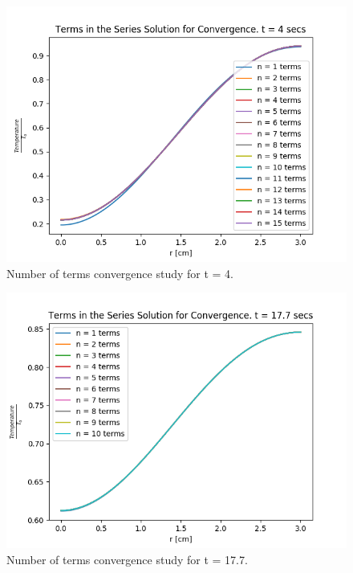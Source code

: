\documentclass[12pt,letterpaper]{article}
\begin{document}
\begin{figure}[htbp!]
  \begin{center}
    \includegraphics[scale=0.7]{terms_4.png}
  \end{center}
  \caption{Number of terms convergence study for t = 4.}
  \label{fig:4}
\end{figure}

\begin{figure}[htbp!]
  \begin{center}
    \includegraphics[scale=0.7]{terms_177.png}
  \end{center}
  \caption{Number of terms convergence study for t = 17.7.}
  \label{fig:17}
\end{figure}
\end{document}
